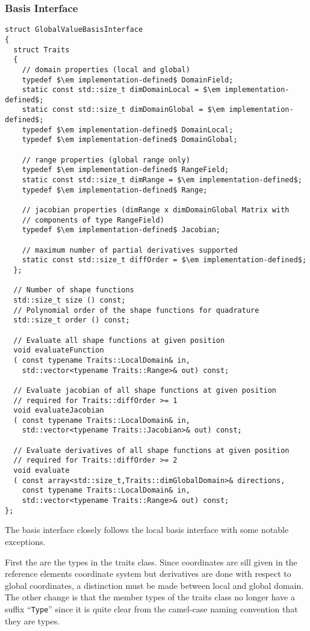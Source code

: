 \documentclass[a4paper,11pt]{article}
\begin{document}
\subsubsection{Basis Interface}
\begin{lstlisting}[escapechar=\$]
struct GlobalValueBasisInterface
{
  struct Traits
  {
    // domain properties (local and global)
    typedef $\em implementation-defined$ DomainField;
    static const std::size_t dimDomainLocal = $\em implementation-defined$;
    static const std::size_t dimDomainGlobal = $\em implementation-defined$;
    typedef $\em implementation-defined$ DomainLocal;
    typedef $\em implementation-defined$ DomainGlobal;

    // range properties (global range only)
    typedef $\em implementation-defined$ RangeField;
    static const std::size_t dimRange = $\em implementation-defined$;
    typedef $\em implementation-defined$ Range;

    // jacobian properties (dimRange x dimDomainGlobal Matrix with
    // components of type RangeField)
    typedef $\em implementation-defined$ Jacobian;

    // maximum number of partial derivatives supported
    static const std::size_t diffOrder = $\em implementation-defined$;
  };

  // Number of shape functions
  std::size_t size () const;
  // Polynomial order of the shape functions for quadrature
  std::size_t order () const;

  // Evaluate all shape functions at given position
  void evaluateFunction
  ( const typename Traits::LocalDomain& in,
    std::vector<typename Traits::Range>& out) const;

  // Evaluate jacobian of all shape functions at given position
  // required for Traits::diffOrder >= 1
  void evaluateJacobian
  ( const typename Traits::LocalDomain& in,
    std::vector<typename Traits::Jacobian>& out) const;

  // Evaluate derivatives of all shape functions at given position
  // required for Traits::diffOrder >= 2
  void evaluate
  ( const array<std::size_t,Traits::dimGlobalDomain>& directions,
    const typename Traits::LocalDomain& in,
    std::vector<typename Traits::Range>& out) const;
};
\end{lstlisting}
The basis interface closely follows the local basis interface with some
notable exceptions.

First the are the types in the traits class.  Since coordinates are sill given
in the reference elements coordinate system but derivatives are done with
respect to global coordinates, a distinction must be made between local and
global domain.  The other change is that the member types of the traits class
no longer have a suffix ``{\tt Type}'' since it is quite clear from the
camel-case naming convention that they are types.
\end{document}
